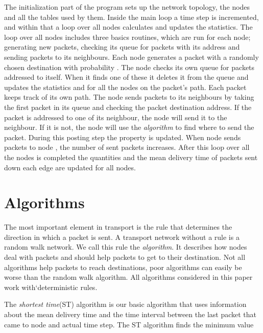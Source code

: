 \documentclass[runningheads]{llncs}
\begin{document}
The initialization part of the program sets up the network topology,
the nodes and all the tables used by them. Inside the main loop a
time step is incremented, and within that a loop over all nodes
calculates and updates the statistics. The loop over all nodes
includes three basics routines, which are run for each node;
generating new packets, checking its queue for packets with its
address and sending packets to its neighbours. Each node generates a
packet with a randomly chosen destination with probability .
The node checks its own queue for packets addressed to itself. When
it finds one of these it deletes it from the queue and updates the
statistics  and  for all the nodes on the packet's
path. Each packet keeps track of its own path. The node sends
packets to its neighbours by taking the first packet in its queue
and checking the packet destination address. If the packet is
addressed to one of its neighbour, the node will send it to the
neighbour. If it is not, the node will use the \emph{algorithm} to
find where to send the packet. During this posting step the 
property is updated. When node  sends packets to node , the
number of sent packets  increases. After this loop over all
the nodes is completed the quantities  and the mean
delivery time of packets sent down each edge  are
updated for all nodes.

\section{Algorithms}
The most important element in transport is the rule that determines
the direction in which a packet is sent. A transport network without
a rule is a random walk network. We call this rule the
\emph{algorithm}. It describes how nodes deal with packets and
should help packets to get to their destination. Not all algorithms
help packets to reach destinations, poor algorithms can easily be
worse than the random walk algorithm. All algorithms considered in
this paper work with`deterministic rules.

The \emph{shortest time}(ST) algorithm is our basic algorithm that
uses information about the mean delivery time  and
the time interval between the last packet that came to node  and
actual time step. The ST algorithm finds the minimum value
\end{document}
